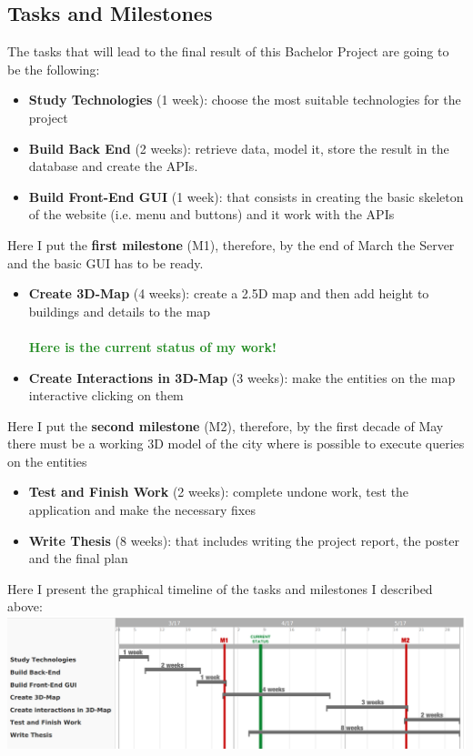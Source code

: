 \documentclass[a4paper]{article}
\begin{document}
\subsection*{Tasks and Milestones}
The tasks that will lead to the final result of this Bachelor Project are going to be the following:
\begin{itemize}
	\item {\bf Study Technologies} (1 week): choose the most suitable technologies for the project
	\item {\bf Build Back End} (2 weeks): retrieve data, model it, store the result in the database and create the APIs.
	\item {\bf Build Front-End GUI} (1 week): that consists in creating the basic skeleton of the website (i.e. menu and buttons) and it work with the APIs
\end{itemize}
Here I put the {\bf first milestone} (M1), therefore, by the end of March the Server and the basic GUI has to be ready.
\begin{itemize}
	\item {\bf Create 3D-Map} (4 weeks): create a 2.5D map and then add height to buildings and details to the map
	\\\\ \textcolor{ForestGreen}{\bf Here is the current status of my work!}\\
	\item {\bf Create Interactions in 3D-Map} (3 weeks): make the entities on the map interactive clicking on them
\end{itemize}
Here I put the {\bf second milestone} (M2), therefore, by the first decade of May there must be a working 3D model of the city where is possible to execute queries on the entities
\begin{itemize}
	\item {\bf Test and Finish Work} (2 weeks): complete undone work, test the application and make the necessary fixes
	\item {\bf Write Thesis} (8 weeks): that includes writing the project report, the poster and the final plan
\end{itemize}
Here I present the graphical timeline of the tasks and milestones I described above:\\

\hspace*{-1cm}\includegraphics[scale=0.4]{Plan_timeline}
\end{document}

